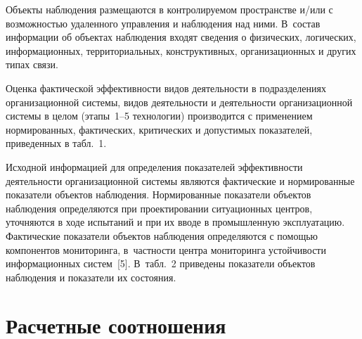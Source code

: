 \begin{multicols}{2}
Объекты наблюдения размещаются в контролируемом пространстве
и/или с возможностью удаленного управления и наблюдения над ними. В~состав
информации об объектах наблюдения входят сведения о физических, логических,
информационных, территориальных, конструктивных, организационных и других
типах связи.

     Оценка фактической эффективности видов деятель\-ности в подразделениях
организационной сис\-те\-мы, видов деятельности и деятельности организационной
системы в целом (этапы~1--5 технологии) производится с применением
нормированных, фактических, критических и допустимых показателей,
приведенных в табл.~1.



     Исходной информацией для определения по\-казателей эффективности
деятельности организационной системы являются фактические и нормированные
показатели объектов наблюдения. Нормированные показатели объектов наблюдения
определяются при проектировании ситуационных центров, уточняются в ходе
испытаний и при их вводе в промышленную эксплуатацию. Фактические показатели
объектов наблюдения опре\-де\-ляются с помощью компонентов мониторинга,
в~част\-ности центра мониторинга устойчивости информационных систем~[5].
В~табл.~2 приведены показатели объектов наблюдения и показатели их состояния.



\section{Расчетные соотношения }


\end{multicols}
